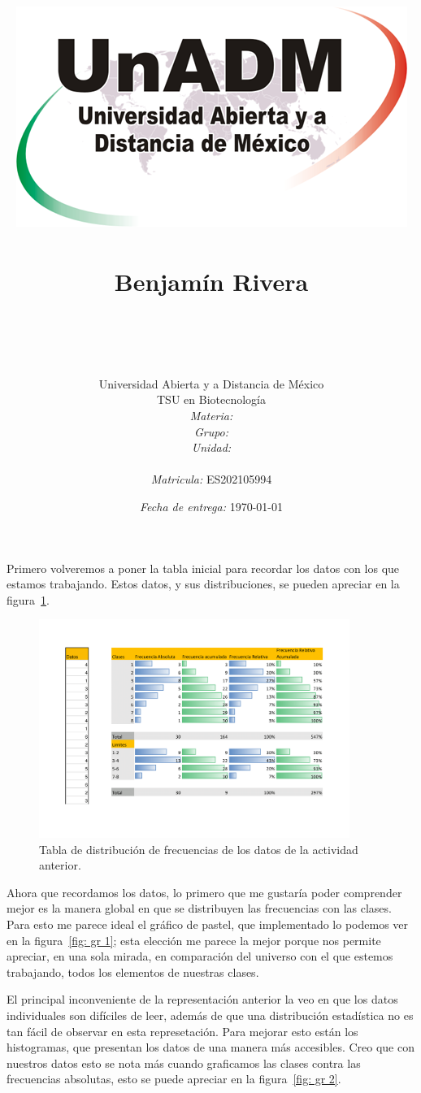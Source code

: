 \documentclass[12pt]{article}
\title{
	\includegraphics{../../../assets/logo-unadm} \\
	\ \\ Benjam\'in Rivera \\
	\bf{\titulo}\\\ \\}
\author{
	Universidad Abierta y a Distancia de México \\
	TSU en Biotecnolog\'ia \\
	\textit{Materia:} \materia \\
	\textit{Grupo:} \grupo \\
	\textit{Unidad:} \unidad \\
	\\
	\textit{Matricula:} ES202105994 }
\date{\textit{Fecha de entrega:} \today}
\begin{document}
\maketitle\newpage

	\par Primero volveremos a poner la tabla inicial para recordar los datos con los que estamos trabajando. Estos datos, y sus distribuciones, se pueden apreciar en la figura~\ref{fig: tabla}.
	
	\begin{figure}[htp]
		\centering
			\includegraphics[width=0.9\textwidth]{Book1.png}
		\caption{Tabla de distribuci\'on de frecuencias de los datos de la actividad anterior.}
		\label{fig: tabla}
	\end{figure}
	
	\par Ahora que recordamos los datos, lo primero que me gustar\'ia poder comprender mejor es la manera global en que se distribuyen las frecuencias con las clases. Para esto me parece ideal el gr\'afico de pastel, que implementado lo podemos ver en la figura~\ref{fig: gr 1}; esta elecci\'on me parece la mejor porque nos permite apreciar, en una sola mirada, en comparaci\'on del universo con el que estemos trabajando, todos los elementos de nuestras clases.
	
	\par El principal inconveniente de la representaci\'on anterior la veo en que los datos individuales son difíciles de leer, adem\'as de que una distribuci\'on estad\'istica no es tan f\'acil de observar en esta represetaci\'on. Para mejorar esto est\'an los histogramas, que presentan los datos de una manera m\'as accesibles. Creo que con nuestros datos esto se nota m\'as cuando graficamos las clases contra las frecuencias absolutas, esto se puede apreciar en la figura~\ref{fig: gr 2}.
\end{document}
